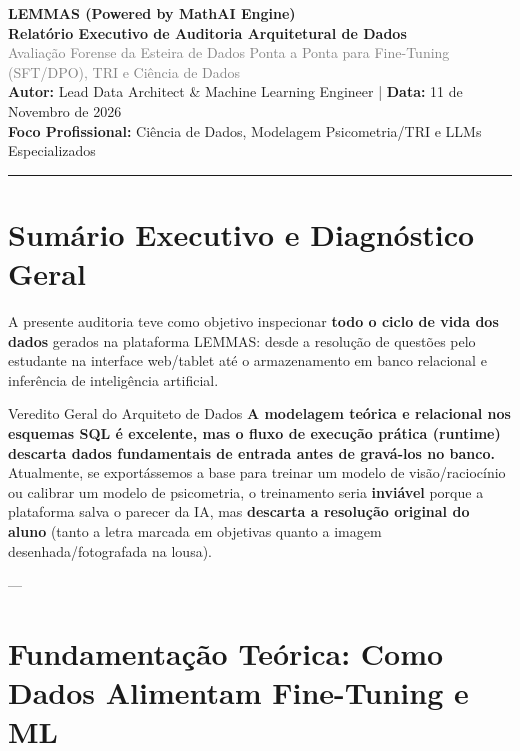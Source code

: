\documentclass[11pt,a4paper]{article}
\begin{document}
\begin{center}
    {\LARGE\bfseries\sffamily LEMMAS (Powered by MathAI Engine)}\\[0.3em]
    {\large\bfseries\color{lemmasNavy} Relatório Executivo de Auditoria Arquitetural de Dados}\\[0.2em]
    {\normalsize\textcolor{gray}{Avaliação Forense da Esteira de Dados Ponta a Ponta para Fine-Tuning (SFT/DPO), TRI e Ciência de Dados}}\\[0.8em]
    \textbf{Autor:} Lead Data Architect \& Machine Learning Engineer \quad | \quad \textbf{Data:} 11 de Novembro de 2026\\[0.2em]
    \textbf{Foco Profissional:} Ciência de Dados, Modelagem Psicometria/TRI e LLMs Especializados
\end{center}

\vspace{0.3cm}
\hrule
\vspace{0.4cm}

\section{Sumário Executivo e Diagnóstico Geral}

A presente auditoria teve como objetivo inspecionar \textbf{todo o ciclo de vida dos dados} gerados na plataforma LEMMAS: desde a resolução de questões pelo estudante na interface web/tablet até o armazenamento em banco relacional e inferência de inteligência artificial.

\begin{criticoBox}{Veredito Geral do Arquiteto de Dados}
\textbf{A modelagem teórica e relacional nos esquemas SQL é excelente, mas o fluxo de execução prática (runtime) descarta dados fundamentais de entrada antes de gravá-los no banco.}
Atualmente, se exportássemos a base para treinar um modelo de visão/raciocínio ou calibrar um modelo de psicometria, o treinamento seria \textbf{inviável} porque a plataforma salva o parecer da IA, mas \textbf{descarta a resolução original do aluno} (tanto a letra marcada em objetivas quanto a imagem desenhada/fotografada na lousa).
\end{criticoBox}

---

\section{Fundamentação Teórica: Como Dados Alimentam Fine-Tuning e ML}
\end{document}
